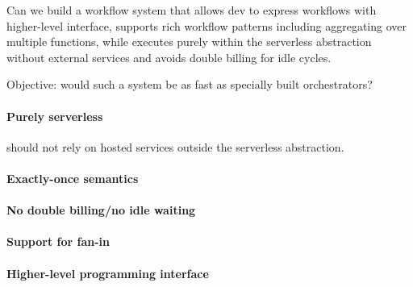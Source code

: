 Can we build a workflow system that allows dev to express workflows
with higher-level interface, supports rich workflow patterns including
aggregating over multiple functions, while executes purely within the
serverless abstraction without external services and avoids double billing
for idle cycles.

Objective: would such a system be as fast as specially built orchestrators?

\paragraph{Purely serverless} should not rely on hosted services outside the
serverless abstraction.

\paragraph{Exactly-once semantics}

\paragraph{No double billing/no idle waiting}

\paragraph{Support for fan-in}

\paragraph{Higher-level programming interface}




